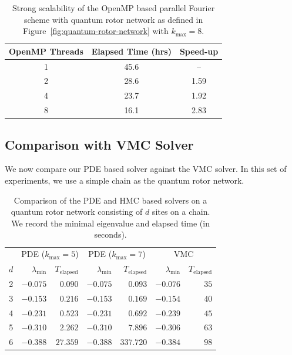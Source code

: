 \documentclass{amsart}
\begin{document}
\begin{table}
  \renewcommand*{\arraystretch}{1.3}
  \centering
  \begin{tabular}{c | c | c}
    \hline
    OpenMP Threads & Elapsed Time (hrs) & Speed-up\\
    \hline
    1 & 45.6 &  --  \\
    2 & 28.6 & 1.59 \\
    4 & 23.7 & 1.92 \\
    8 & 16.1 & 2.83 \\
    \hline
  \end{tabular}
  \vspace{1em}
  \caption{Strong scalability of the OpenMP based parallel Fourier scheme with
  quantum rotor network as defined in Figure~\ref{fig:quantum-rotor-network}
  with $k_\text{max} = 8$.}
  \label{tab:strong-scaling}
\end{table}

\subsection{Comparison with VMC Solver}

We now compare our PDE based solver against the VMC solver. In this set of
experiments, we use a simple chain as the quantum rotor network.

\begin{table}
  \renewcommand*{\arraystretch}{1.3}
  \centering
  \begin{tabular}{c | r r | r r | r r}
    \hline
        & \multicolumn{2}{c|}{PDE ($k_\text{max} = 5$)}
        & \multicolumn{2}{c|}{PDE ($k_\text{max} = 7$)}
        & \multicolumn{2}{c}{VMC} \\
    \cline{2-7}
    $d$ & $\lambda_\text{min}$ & $T_\text{elapsed}$ & $\lambda_\text{min}$
        & $T_\text{elapsed}$ & $\lambda_\text{min}$ & $T_\text{elapsed}$ \\
    \hline
    2 & $-0.075$ &  $0.090$ & $-0.075$ &   $0.093$ & $-0.076$ & $35$ \\
    3 & $-0.153$ &  $0.216$ & $-0.153$ &   $0.169$ & $-0.154$ & $40$ \\
    4 & $-0.231$ &  $0.523$ & $-0.231$ &   $0.692$ & $-0.239$ & $45$ \\
    5 & $-0.310$ &  $2.262$ & $-0.310$ &   $7.896$ & $-0.306$ & $63$ \\
    6 & $-0.388$ & $27.359$ & $-0.388$ & $337.720$ & $-0.384$ & $98$ \\
    \hline
  \end{tabular}
  \vspace{1em}
  \caption{Comparison of the PDE and HMC based solvers on a quantum rotor
  network consisting of $d$ sites on a chain. We record the minimal eigenvalue
  and elapsed time (in seconds).}
  \label{tab:pde-hmc}
\end{table}
\end{document}
